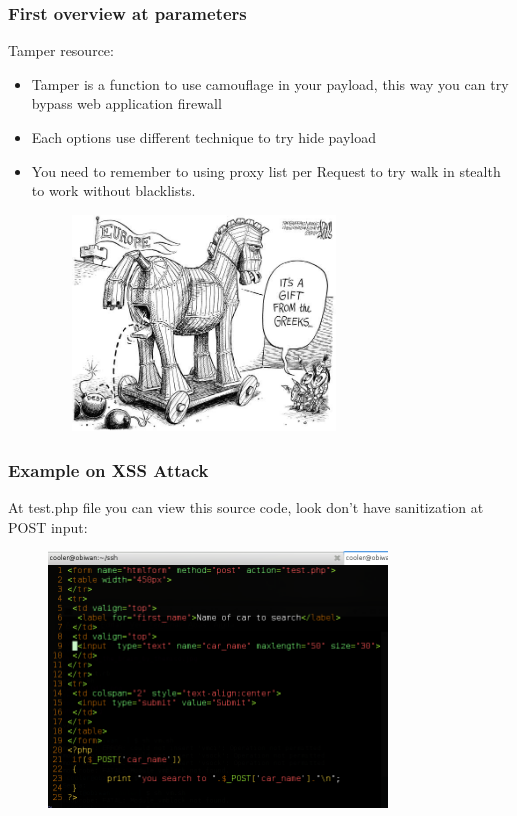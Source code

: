 \documentclass[serif,mathserif]{beamer}
\begin{document}
\begin{frame}
  \frametitle{First overview at parameters}
  Tamper resource:
  \begin{itemize}
  \item Tamper is a function to use camouflage in your payload, this way you can try bypass web application firewall
  \item Each options use different technique to try hide payload 
  \item You need to remember to using proxy list per Request to try walk in stealth to work without blacklists.  
  \begin{figure}[t]
    \centering
    \includegraphics[width=7cm]{images/gift2.jpg}
  \end{figure}
 \end{itemize}
\end{frame}


\begin{frame}
  \frametitle{Example on XSS Attack}
  At test.php file you can view this source code, look don't have sanitization at POST input:
  \begin{itemize}
  \begin{figure}[t]
    \centering
    \includegraphics[width=9cm]{images/code_test_php.png}
  \end{figure}
 \end{itemize}
\end{frame}
\end{document}

